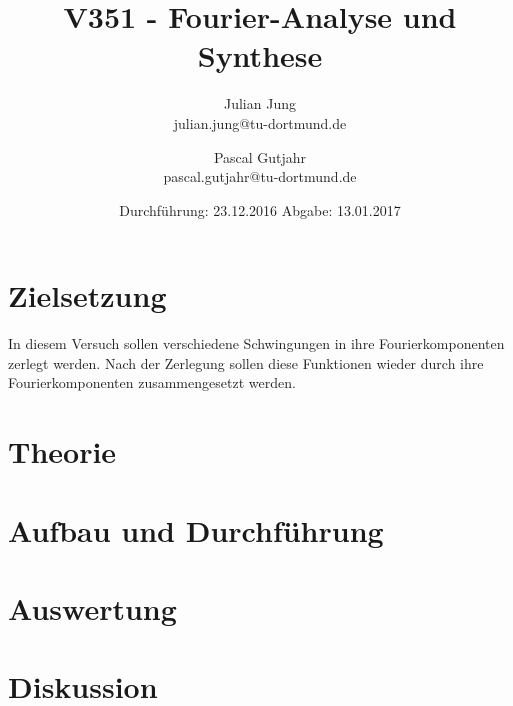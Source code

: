 

\title{V351 - Fourier-Analyse und Synthese}
\author{Julian Jung \\ julian.jung@tu-dortmund.de
  \and Pascal Gutjahr \\ pascal.gutjahr@tu-dortmund.de}
  \date{Durchführung: 23.12.2016
  \hspace{3em}
  Abgabe: 13.01.2017}
  
\maketitle
\newpage
\tableofcontents
\newpage
\section{Zielsetzung}
In diesem Versuch sollen verschiedene Schwingungen in ihre
Fourierkomponenten zerlegt werden. Nach der Zerlegung sollen diese Funktionen
wieder durch ihre Fourierkomponenten zusammengesetzt werden.
\section{Theorie}
 
\section{Aufbau und Durchführung}
 
\section{Auswertung}
 
\section{Diskussion}
 
\printbibliography

